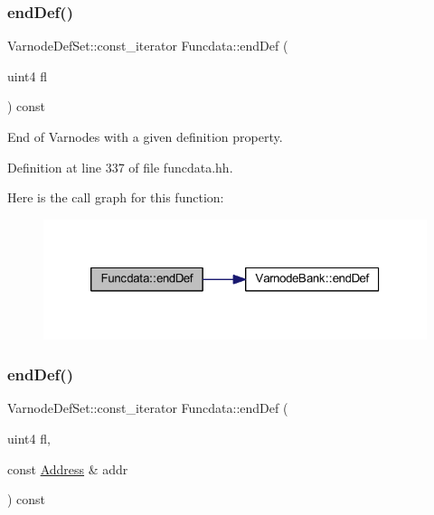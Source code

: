 \subsubsection{\texorpdfstring{endDef()}{endDef()}\hspace{0.1cm}{\footnotesize\ttfamily [2/3]}}
{\footnotesize\ttfamily Varnode\+Def\+Set\+::const\+\_\+iterator Funcdata\+::end\+Def (\begin{DoxyParamCaption}\item[{uint4}]{fl }\end{DoxyParamCaption}) const\hspace{0.3cm}{\ttfamily [inline]}}



End of Varnodes with a given definition property. 



Definition at line 337 of file funcdata.\+hh.

Here is the call graph for this function\+:
\nopagebreak
\begin{figure}[H]
\begin{center}
\leavevmode
\includegraphics[width=320pt]{class_funcdata_a5fa192d156e74fef2a22c274b86f3e73_cgraph}
\end{center}
\end{figure}
\mbox{\label{class_funcdata_ab112eb1f47f8e32c0018c7af989f519c}} 
\subsubsection{\texorpdfstring{endDef()}{endDef()}\hspace{0.1cm}{\footnotesize\ttfamily [3/3]}}
{\footnotesize\ttfamily Varnode\+Def\+Set\+::const\+\_\+iterator Funcdata\+::end\+Def (\begin{DoxyParamCaption}\item[{uint4}]{fl,  }\item[{const \mbox{\hyperlink{class_address}{Address}} \&}]{addr }\end{DoxyParamCaption}) const\hspace{0.3cm}{\ttfamily [inline]}}



